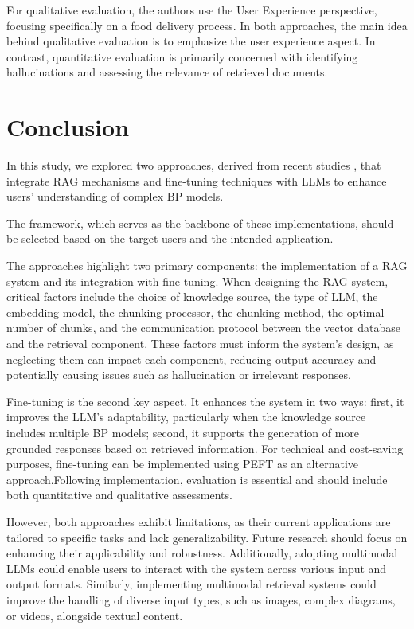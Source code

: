 \documentclass[%
    paper=A4,                    %
    twoside=true,               %
    openright,                  %
    parskip=full,               %
    chapterprefix=true,         %
    11pt,                       %
    headings=normal,            %
    bibliography=totoc,         %
    listof=totoc,              %
    titlepage=on,              %
    captions=tableabove,        %
    draft=false,               %
]{scrreprt}%
\begin{document}
For qualitative evaluation, the authors use the User Experience perspective, focusing specifically on a food delivery process.
In both approaches, the main idea behind qualitative evaluation is to emphasize the user experience aspect. In contrast, quantitative evaluation is primarily concerned with identifying hallucinations and assessing the relevance of retrieved documents.










\chapter{Conclusion}
\label{conclusion}

In this study, we explored two approaches, derived from recent studies \cite{franzoi2024using,bernardi2024conversing}, that integrate RAG mechanisms and fine-tuning techniques with LLMs to enhance users' understanding of complex BP models.

The framework, which serves as the backbone of these implementations, should be selected based on the target users and the intended application.

The approaches highlight two primary components: the implementation of a RAG system and its integration with fine-tuning. When designing the RAG system, critical factors include the choice of knowledge source, the type of LLM, the embedding model, the chunking processor, the chunking method, the optimal number of chunks, and the communication protocol between the vector database and the retrieval component. These factors must inform the system's design, as neglecting them can impact each component, reducing output accuracy and potentially causing issues such as hallucination or irrelevant responses.

Fine-tuning is the second key aspect. It enhances the system in two ways: first, it improves the LLM's adaptability, particularly when the knowledge source includes multiple BP models; second, it supports the generation of more grounded responses based on retrieved information. For technical and cost-saving purposes, fine-tuning can be implemented using PEFT as an alternative approach.Following implementation, evaluation is essential and should include both quantitative and qualitative assessments.

However, both approaches exhibit limitations, as their current applications are tailored to specific tasks and lack generalizability. Future research should focus on enhancing their applicability and robustness. Additionally, adopting multimodal LLMs could enable users to interact with the system across various input and output formats. Similarly, implementing multimodal retrieval systems could improve the handling of diverse input types, such as images, complex diagrams, or videos, alongside textual content.
\end{document}

